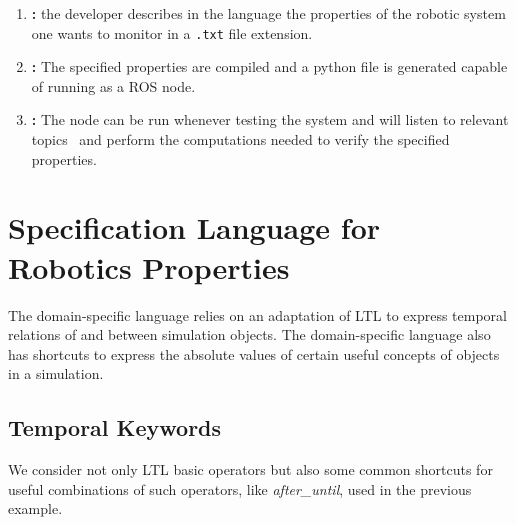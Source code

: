 \documentclass[runningheads]{llncs}
\begin{document}
\begin{enumerate}[label=(\roman*)]
    \item \textbf{:} the developer describes in the language the properties of the robotic system one wants to monitor in a \texttt{.txt} file extension.
    \item \textbf{:} The specified properties are compiled and a python file is generated capable of running as a ROS node.
    \item \textbf{:} The node can be run whenever testing the system and will listen to relevant topics~ and perform the computations needed to verify the specified properties.
\end{enumerate}


\section{Specification Language for Robotics Properties}

The domain-specific language relies on an adaptation of LTL to express temporal relations of and between simulation objects. The domain-specific language also has shortcuts to express the absolute values of certain useful concepts of objects in a simulation. 


\subsection{Temporal Keywords}

We consider not only LTL basic operators but also some common shortcuts for useful combinations of such operators, like \textit{after\_until}, used in the previous example.
\end{document}
